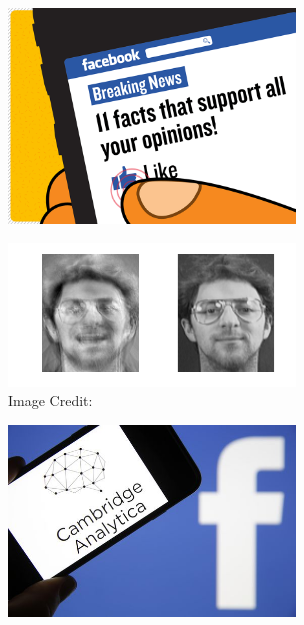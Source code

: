 \documentclass[10pt]{beamer}
\begin{document}
\begin{frame}[fragile]{}
  \begin{figure}
  \centering
  \includegraphics[width=3in]{echo_chamber.png} \\
  \end{figure}
\end{frame}

\begin{frame}[fragile]{}
  \begin{figure}
  \centering
  \includegraphics[width=3in]{inversion.png} \\
  \footnotesize Image Credit: \cite{FredriksonJR15}
  \end{figure}
\end{frame}

\begin{frame}[fragile]{}
  \begin{figure}
  \centering
  \includegraphics[width=3in]{cambridge_analytica.jpg} \\
  \end{figure}
\end{frame}
\end{document}
